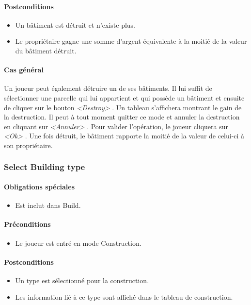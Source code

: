 \documentclass[a4paper,11pt]{report}
\begin{document}
\paragraph{Postconditions}
\begin{itemize}
 \item Un bâtiment est détruit et n’existe plus.
 \item Le propriétaire gagne une somme d'argent équivalente à la moitié de la valeur du bâtiment détruit.
\end{itemize}
\paragraph{Cas général}
Un joueur peut également détruire un de ses bâtiments. Il lui suffit de sélectionner une parcelle qui lui appartient et qui possède un bâtiment et ensuite de cliquer sur le bouton \og \textit{<Destroy>} \fg. Un tableau s'affichera montrant le gain de la destruction. Il peut à tout moment quitter ce mode et annuler la destruction en cliquant sur \og \textit{<Annuler>} \fg. Pour valider l'opération, le joueur cliquera sur \og \textit{<Ok>} \fg. Une fois détruit, le bâtiment rapporte la moitié de la valeur de celui-ci à son propriétaire.
\newpage
\subsubsection{Select Building type}
\paragraph{Obligations spéciales}
\begin{itemize}
 \item Est inclut dans Build.
\end{itemize}
\paragraph{Préconditions}
\begin{itemize}
 \item Le joueur est entré en mode Construction.
\end{itemize}
\paragraph{Postconditions}
\begin{itemize}
 \item Un type est sélectionné pour la construction.
 \item Les information lié à ce type sont affiché dans le tableau de construction.
\end{itemize}
\end{document}
